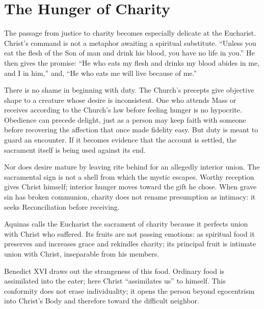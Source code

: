 \section{The Hunger of Charity}

The passage from justice to charity becomes especially delicate at the Eucharist. Christ's command is not a metaphor awaiting a spiritual substitute. ``Unless you eat the flesh of the Son of man and drink his blood, you have no life in you.'' He then gives the promise: ``He who eats my flesh and drinks my blood abides in me, and I in him,'' and, ``He who eats me will live because of me.''

There is no shame in beginning with duty. The Church's precepts give objective shape to a creature whose desire is inconsistent. One who attends Mass or receives according to the Church's law before feeling hunger is no hypocrite. Obedience can precede delight, just as a person may keep faith with someone before recovering the affection that once made fidelity easy. But duty is meant to guard an encounter. If it becomes evidence that the account is settled, the sacrament itself is being used against its end.

Nor does desire mature by leaving rite behind for an allegedly interior union. The sacramental sign is not a shell from which the mystic escapes. Worthy reception gives Christ himself; interior hunger moves toward the gift he chose. When grave sin has broken communion, charity does not rename presumption as intimacy: it seeks Reconciliation before receiving.

Aquinas calls the Eucharist the sacrament of charity because it perfects union with Christ who suffered. Its fruits are not passing emotions: as spiritual food it preserves and increases grace and rekindles charity; its principal fruit is intimate union with Christ, inseparable from his members.

Benedict XVI draws out the strangeness of this food. Ordinary food is assimilated into the eater; here Christ ``assimilates us'' to himself. This conformity does not erase individuality; it opens the person beyond egocentrism into Christ's Body and therefore toward the difficult neighbor.

